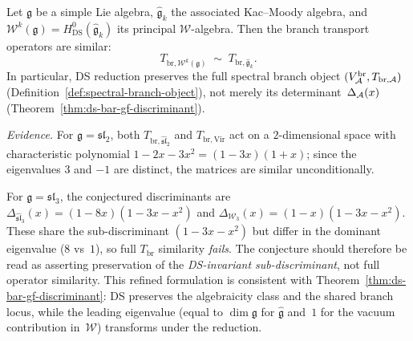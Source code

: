 \begin{conjecture}\label{conj:ds-spectral-branch-preservation}
Let $\mathfrak{g}$ be a simple Lie algebra,
$\widehat{\mathfrak{g}}_k$ the associated Kac--Moody algebra, and
$\mathcal{W}^k(\mathfrak{g}) = H^0_{\mathrm{DS}}(\widehat{\mathfrak{g}}_k)$
its principal $\mathcal{W}$-algebra.
Then the branch transport operators are similar:
\[
T_{\mathrm{br},\mathcal{W}^k(\mathfrak{g})}
\;\sim\;
T_{\mathrm{br},\widehat{\mathfrak{g}}_k}.
\]
In particular, DS reduction preserves the full spectral branch
object $(V_{\mathcal{A}}^{\mathrm{br}}, T_{\mathrm{br},\mathcal{A}})$
\textup{(}Definition~\textup{\ref{def:spectral-branch-object})},
not merely its determinant~$\Delta_{\mathcal{A}}(x)$
\textup{(}Theorem~\textup{\ref{thm:ds-bar-gf-discriminant})}.

\emph{Evidence.}
For $\mathfrak{g} = \mathfrak{sl}_2$, both
$T_{\mathrm{br},\widehat{\mathfrak{sl}}_2}$ and
$T_{\mathrm{br},\mathrm{Vir}}$ act on a $2$-dimensional
space with characteristic polynomial $1 - 2x - 3x^2
= (1-3x)(1+x)$; since the eigenvalues $3$ and $-1$ are distinct,
the matrices are similar unconditionally.

For $\mathfrak{g} = \mathfrak{sl}_3$,
the conjectured discriminants are
$\Delta_{\widehat{\mathfrak{sl}}_3}(x) = (1-8x)(1-3x-x^2)$
and $\Delta_{\mathcal{W}_3}(x) = (1-x)(1-3x-x^2)$.
These share the sub-discriminant $(1-3x-x^2)$ but differ in
the dominant eigenvalue ($8$ vs~$1$), so full
$T_{\mathrm{br}}$ similarity \emph{fails}.  The conjecture
should therefore be read as asserting preservation of the
\emph{DS-invariant sub-discriminant}, not full operator
similarity.  This refined formulation is consistent with
Theorem~\ref{thm:ds-bar-gf-discriminant}: DS preserves the
algebraicity class and the shared branch locus, while the
leading eigenvalue (equal to $\dim\mathfrak{g}$ for
$\widehat{\mathfrak{g}}$ and~$1$ for the vacuum
contribution in~$\mathcal{W}$) transforms under the
reduction.
\end{conjecture}

